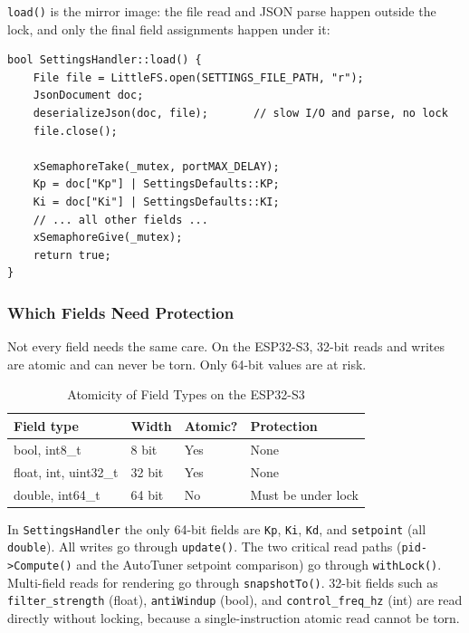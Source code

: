 \texttt{load()} is the mirror image: the file read and JSON parse happen outside the lock,
and only the final field assignments happen under it:

\begin{lstlisting}[caption=SettingsHandler::load - Assign Under Lock]
bool SettingsHandler::load() {
    File file = LittleFS.open(SETTINGS_FILE_PATH, "r");
    JsonDocument doc;
    deserializeJson(doc, file);       // slow I/O and parse, no lock
    file.close();

    xSemaphoreTake(_mutex, portMAX_DELAY);
    Kp = doc["Kp"] | SettingsDefaults::KP;
    Ki = doc["Ki"] | SettingsDefaults::KI;
    // ... all other fields ...
    xSemaphoreGive(_mutex);
    return true;
}
\end{lstlisting}

\subsubsection{Which Fields Need Protection}

Not every field needs the same care. On the ESP32-S3, 32-bit reads and writes are atomic
and can never be torn. Only 64-bit values are at risk.

\begin{table}[H]
\centering
\begin{tabular}{@{}llll@{}}
\toprule
\textbf{Field type} & \textbf{Width} & \textbf{Atomic?} & \textbf{Protection} \\
\midrule
bool, int8\_t & 8 bit & Yes & None \\
float, int, uint32\_t & 32 bit & Yes & None \\
double, int64\_t & 64 bit & No & Must be under lock \\
\bottomrule
\end{tabular}
\caption{Atomicity of Field Types on the ESP32-S3}
\end{table}

In \texttt{SettingsHandler} the only 64-bit fields are \texttt{Kp}, \texttt{Ki},
\texttt{Kd}, and \texttt{setpoint} (all \texttt{double}). All writes go through
\texttt{update()}. The two critical read paths (\texttt{pid->Compute()} and the AutoTuner
setpoint comparison) go through \texttt{withLock()}. Multi-field reads for rendering go
through \texttt{snapshotTo()}. 32-bit fields such as \texttt{filter\_strength} (float),
\texttt{antiWindup} (bool), and \texttt{control\_freq\_hz} (int) are read directly without
locking, because a single-instruction atomic read cannot be torn.

